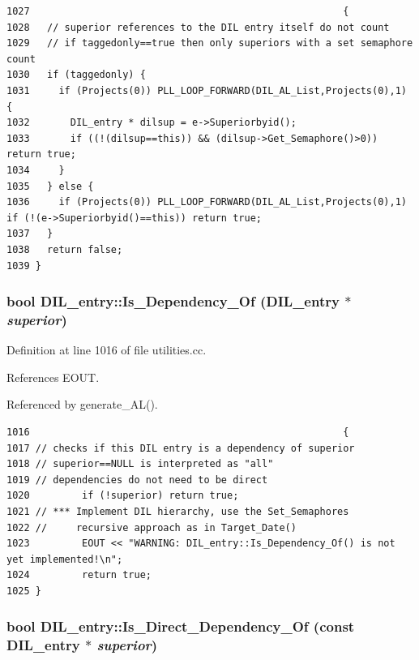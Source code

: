 \footnotesize\begin{verbatim}1027                                                      {
1028   // superior references to the DIL entry itself do not count
1029   // if taggedonly==true then only superiors with a set semaphore count
1030   if (taggedonly) {
1031     if (Projects(0)) PLL_LOOP_FORWARD(DIL_AL_List,Projects(0),1) {
1032       DIL_entry * dilsup = e->Superiorbyid();
1033       if ((!(dilsup==this)) && (dilsup->Get_Semaphore()>0)) return true;
1034     }
1035   } else {
1036     if (Projects(0)) PLL_LOOP_FORWARD(DIL_AL_List,Projects(0),1) if (!(e->Superiorbyid()==this)) return true;
1037   }
1038   return false;
1039 }
\end{verbatim}\normalsize 
{}
\subsubsection{\setlength{\rightskip}{0pt plus 5cm}bool DIL\_\-entry::Is\_\-Dependency\_\-Of (DIL\_\-entry $\ast$ {\em superior})}\label{classDIL__entry_a19}




Definition at line 1016 of file utilities.cc.

References EOUT.

Referenced by generate\_\-AL().



\footnotesize\begin{verbatim}1016                                                      {
1017 // checks if this DIL entry is a dependency of superior
1018 // superior==NULL is interpreted as "all"
1019 // dependencies do not need to be direct
1020         if (!superior) return true;
1021 // *** Implement DIL hierarchy, use the Set_Semaphores
1022 //     recursive approach as in Target_Date()
1023         EOUT << "WARNING: DIL_entry::Is_Dependency_Of() is not yet implemented!\n";
1024         return true;
1025 }
\end{verbatim}\normalsize 
{}
\subsubsection{\setlength{\rightskip}{0pt plus 5cm}bool DIL\_\-entry::Is\_\-Direct\_\-Dependency\_\-Of (const DIL\_\-entry $\ast$ {\em superior})}\label{classDIL__entry_a18}




